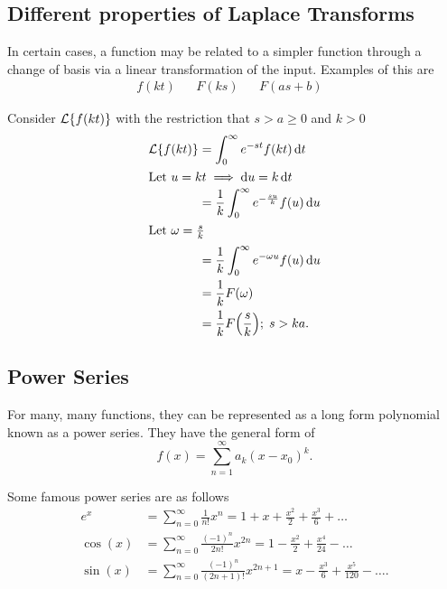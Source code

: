 \documentclass[../notes.tex]{subfiles}
\begin{document}
\subsection{Different properties of Laplace Transforms}

In certain cases, a function may be related to a simpler function through a change of basis via a linear transformation of the input. Examples of this are
\begin{align*}
    f(kt) &
    & F(ks) &
    & F(as + b) &
\end{align*}

Consider $\mathcal{L}\qty{ f(kt) }$ with the restriction that $s > a \geq 0$ and $k > 0$
\begin{align*}
    \mathcal{L}\qty{ f(kt) } &= \int_0^{\infty} e^{-st} f(kt) \dd{t}\\
    \intertext{Let $u = kt \implies \dd u = k \dd{t}$}
    &= \frac{1}{k}\int_0^{\infty} e^{-\frac{su}{k}} f(u) \dd{u}\\
    \intertext{Let $\omega = \frac{s}{k}$}
    &= \frac{1}{k}\int_0^{\infty} e^{-\omega u } f(u) \dd{u}\\
    &= \frac{1}{k} F(\omega) \\
    &= \frac{1}{k} F\qty(\frac{s}{k}); \; s > ka
.\end{align*}

\subsection{Power Series}

For many, many functions, they can be represented as a long form polynomial known as a power series. They have the general form of
\[
     f(x) = \sum_{n=1}^{\infty} a_k (x - x_0)^{k}
.\]

Some famous power series are as follows
\begin{align*}
    e^{x} &= \sum_{n=0}^{\infty} \frac{1}{n!} x^{n} = 1 + x + \frac{x^2}{2} + \frac{x^3}{6} + \ldots \\
    \cos(x) &= \sum_{n=0}^{\infty} \frac{(-1)^{n}}{2n!} x^{2n} = 1 - \frac{x^2}{2} + \frac{x^{4}}{24} - \ldots \\
    \sin(x) &= \sum_{n=0}^{\infty} \frac{(-1)^{n}}{(2n+1)!} x^{2n+1} = x - \frac{x^3}{6} + \frac{x^5}{120} - \ldots
.\end{align*}
\end{document}
